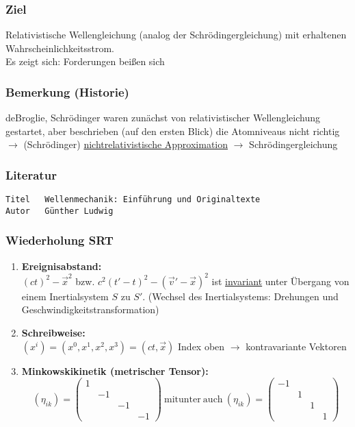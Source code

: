 \documentclass[twoside,a4paper]{scrartcl}
\renewcommand{\1}{\mathds{1}}
\newcommand{\ra}{\rightarrow}
\begin{document}
\subsubsection*{Ziel}
Relativistische Wellengleichung (analog der Schrödingergleichung) mit erhaltenen Wahrscheinlichkeitsstrom.\\
Es zeigt sich: Forderungen beißen sich
\subsubsection*{Bemerkung (Historie)}
deBroglie, Schrödinger waren zunächst von relativistischer Wellengleichung gestartet, aber beschrieben (auf den ersten Blick) die Atomniveaus nicht richtig\\
$\ra$ (Schrödinger) \underline{nichtrelativistische Approximation} $\ra$ Schrödingergleichung
\subsubsection*{Literatur}
\begin{tiny}
\begin{verbatim}
Titel	Wellenmechanik: Einführung und Originaltexte
Autor	Günther Ludwig
\end{verbatim}
\end{tiny}


\subsubsection{Wiederholung SRT}
\begin{enumerate}
\item \textbf{Ereignisabstand:}\\
$(ct)^2-\vec x^2$ bzw. $c^2(t'-t)^2-(\vec v'-\vec x)^2$ ist \underline{invariant} unter Übergang von einem Inertialsystem $S$ zu $S'$. (Wechsel des Inertialsystems: Drehungen und Geschwindigkeitstransformation)
\item \textbf{Schreibweise:}\\
$(x^i)=(x^0,x^1,x^2,x^3)=(ct,\vec x)$ Index oben $\ra$ kontravariante Vektoren
\item \textbf{Minkowskikinetik (metrischer Tensor):}\\
$$(\eta_{ik})=\begin{pmatrix}1 \\ & -1 \\ & & -1 \\ & & & -1\end{pmatrix} \ \mathrm{mitunter \ auch \ } (\eta_{ik})=\begin{pmatrix}-1 \\ & 1 \\ & & 1 \\ & & & 1\end{pmatrix}$$
\end{enumerate}
\end{document}
